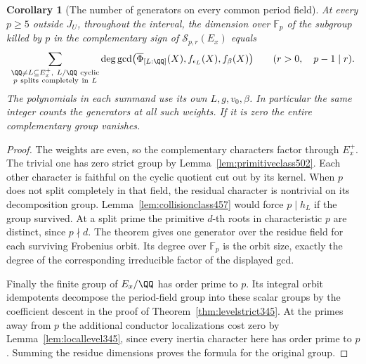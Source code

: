 \documentclass[a4paper,11pt]{article}
\newtheorem{corollary}[proposition]{Corollary}
\theoremstyle{definition}
\theoremstyle{remark}
\numberwithin{equation}{section}
\begin{document}
\begin{corollary}[The number of generators on every common period field]
\leavevmode\label{cor:intervalroots523}
At every \(p\ge5\) outside \(J_U\), throughout the interval,
the dimension over \(\mathbb F_p\) of the subgroup killed by \(p\)
in the complementary sign of \(\mathcal S_{p,r}(E_x)\) equals
\[
 \sum_{\substack{\QQ\ne L\subseteq E_x^+,\ L/\QQ\ {\rm cyclic}\\
                            p\ {\rm splits\ completely\ in}\ L}}
   \deg\gcd\bigl(\overline\Phi_{[L:\QQ]}(X),
                      f_{\epsilon_L}(X), f_{\beta}(X)\bigr)
       \qquad (r>0,\quad p-1\mid r).
\]
The polynomials in each summand use its own \(L,g,v_0,\beta\).
In particular the same integer counts the generators at all such
weights. If it is zero the entire complementary group vanishes.
\end{corollary}
\begin{proof}
The weights are even, so the complementary characters factor through
\(E_x^+\). The trivial one has zero strict group by
Lemma~\ref{lem:primitiveclass502}. Each other character is faithful
on the cyclic quotient cut out by its kernel. When \(p\) does not
split completely in that field, the residual character is nontrivial
on its decomposition group. Lemma~\ref{lem:collisionclass457} would
force \(p\mid h_L\) if the group survived. At a split prime the
primitive \(d\)-th roots in characteristic \(p\) are distinct,
since \(p\nmid d\). The theorem gives one generator over the residue
field for each surviving Frobenius orbit. Its degree over
\(\mathbb F_p\) is the orbit size, exactly the degree of the
corresponding irreducible factor of the displayed gcd.

Finally the finite group of \(E_x/\QQ\) has order prime to \(p\).
Its integral orbit idempotents decompose the period-field group into
these scalar groups by the coefficient descent in the proof of
Theorem~\ref{thm:levelstrict345}. At the primes away from \(p\) the
additional conductor localizations cost zero by
Lemma~\ref{lem:locallevel345}, since every inertia character here
has order prime to \(p\). Summing the residue dimensions proves the
formula for the original group.
\end{proof}
\end{document}
